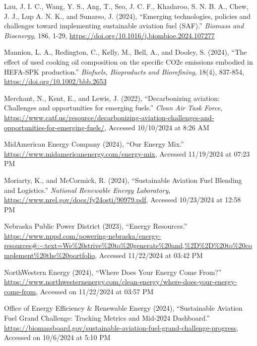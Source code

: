 \documentclass[12pt]{article}
\begin{document}
\begin{description}
    \item Lau, J. I. C., Wang, Y. S., Ang, T., Seo, J. C. F., Khadaroo, S. N. B. A., Chew, J. J., Lup A. N. K., and Sunarso, J. (2024), “Emerging technologies, policies and challenges toward implementing sustainable aviation fuel (SAF).” \textit{Biomass and Bioenergy}, 186, 1-29, \url{https://doi.org/10.1016/j.biombioe.2024.107277}
    
    \item Mannion, L. A., Redington, C., Kelly, M., Bell, A., and Dooley, S. (2024), “The effect of used cooking oil composition on the specific CO2e emissions embodied in HEFA-SPK production.” \textit{Biofuels, Bioproducts and Biorefining}, 18(4), 837-854, \url{https://doi.org/10.1002/bbb.2653}
    
    \item Merchant, N., Kent, E., and Lewis, J. (2022), “Decarbonizing aviation: Challenges and opportunities for emerging fuels.” \textit{Clean Air Task Force}, \url{https://www.catf.us/resource/decarbonizing-aviation-challenges-and-opportunities-for-emerging-fuels/}, Accessed 10/10/2024 at 8:26 AM
    
    \item MidAmerican Energy Company (2024), “Our Energy Mix.” \url{https://www.midamericanenergy.com/energy-mix}, Accessed 11/19/2024 at 07:23 PM
    
    \item Moriarty, K., and McCormick, R. (2024), “Sustainable Aviation Fuel Blending and Logistics.” \textit{National Renewable Energy Laboratory}, \url{https://www.nrel.gov/docs/fy24osti/90979.pdf}, Accessed 10/23/2024 at 12:58 PM
    
    \item Nebraska Public Power District (2023), “Energy Resources.” \url{https://www.nppd.com/powering-nebraska/energy-resources#:~:text=We%20strive%20to%20generate%20and,%2D%2D%20to%20complement%20the%20portfolio}, Accessed 11/22/2024 at 03:42 PM
    
    \item NorthWestern Energy (2024), “Where Does Your Energy Come From?” \url{https://www.northwesternenergy.com/clean-energy/where-does-your-energy-come-from}, Accessed on 11/22/2024 at 03:57 PM
    
    \item Office of Energy Efficiency \& Renewable Energy (2024), “Sustainable Aviation Fuel Grand Challenge: Tracking Metrics and Mid-2024 Dashboard.” \url{https://biomassboard.gov/sustainable-aviation-fuel-grand-challenge-progress}, Accessed on 10/6/2024 at 5:10 PM
    

\end{description}
\end{document}
